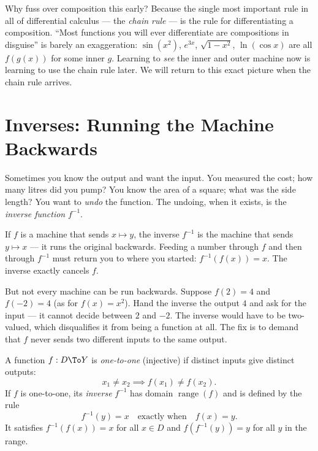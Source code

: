 \begin{aestheticbox}
Why fuss over composition this early? Because the single most important rule in
all of differential calculus --- the \emph{chain rule} --- is the rule for
differentiating a composition. ``Most functions you will ever differentiate are
compositions in disguise'' is barely an exaggeration: $\sin(x^2)$, $e^{3x}$,
$\sqrt{1-x^2}$, $\ln(\cos x)$ are all $f(g(x))$ for some inner $g$. Learning to
\emph{see} the inner and outer machine now is learning to use the chain rule later.
We will return to this exact picture when the chain rule arrives.
\end{aestheticbox}

\section{Inverses: Running the Machine Backwards}
\label{ch02:inverses}

Sometimes you know the output and want the input. You measured the cost; how many
litres did you pump? You know the area of a square; what was the side length? You
want to \emph{undo} the function. The undoing, when it exists, is the
\emph{inverse function} $f^{-1}$.

\begin{intuitionbox}
If $f$ is a machine that sends $x \mapsto y$, the inverse $f^{-1}$ is the machine
that sends $y \mapsto x$ --- it runs the original backwards. Feeding a number
through $f$ and then through $f^{-1}$ must return you to where you started:
$f^{-1}(f(x)) = x$. The inverse exactly cancels $f$.
\end{intuitionbox}

But not every machine can be run backwards. Suppose $f(2) = 4$ and $f(-2) = 4$
(as for $f(x)=x^2$). Hand the inverse the output $4$ and ask for the input --- it
cannot decide between $2$ and $-2$. The inverse would have to be two-valued, which
disqualifies it from being a function at all. The fix is to demand that $f$ never
sends two different inputs to the same output.

\begin{definition}
\label{ch02:def-inverse}
A function $f : D \To Y$ is \emph{one-to-one} (injective) if distinct inputs give
distinct outputs:
\[
  x_1 \ne x_2 \implies f(x_1) \ne f(x_2).
\]
If $f$ is one-to-one, its \emph{inverse} $f^{-1}$ has domain $\operatorname{range}(f)$ and
is defined by the rule
\[
  f^{-1}(y) = x \quad\text{exactly when}\quad f(x) = y.
\]
It satisfies $f^{-1}(f(x)) = x$ for all $x\in D$ and $f(f^{-1}(y)) = y$ for all
$y$ in the range.
\end{definition}

